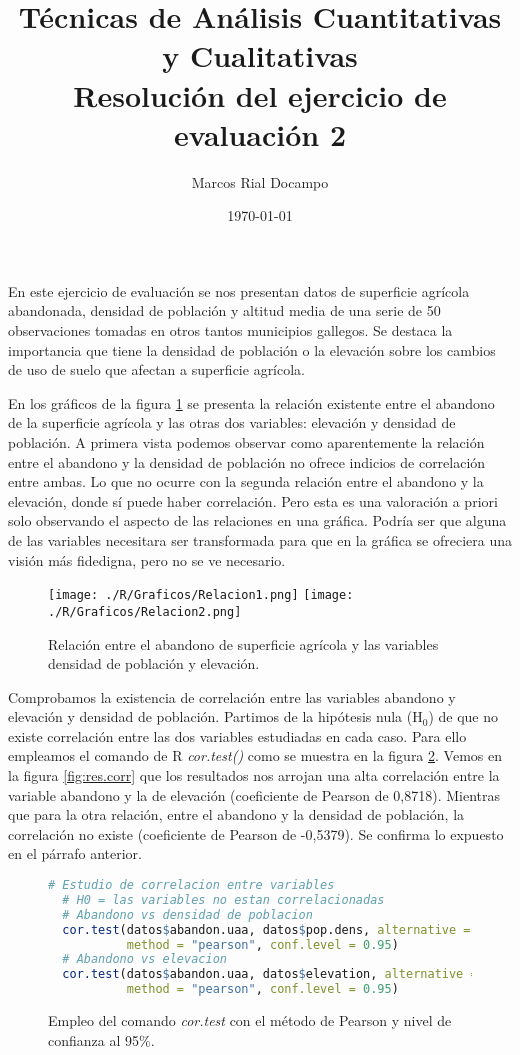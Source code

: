 \documentclass[11pt,a4paper]{article}
\author{Marcos Rial Docampo}
\title{Técnicas de Análisis Cuantitativas y Cualitativas\\Resolución del ejercicio de evaluación 2}
\date{\small{\today}}
\begin{document}
\maketitle

En este ejercicio de evaluación se nos presentan datos de superficie agrícola abandonada, densidad de población y altitud media de una serie de 50 observaciones tomadas en otros tantos municipios gallegos. Se destaca la importancia que tiene la densidad de población o la elevación sobre los cambios de uso de suelo que afectan a superficie agrícola.

En los gráficos de la figura \ref{fig:graficas} se presenta la relación existente entre el abandono de la superficie agrícola y las otras dos variables: elevación y densidad de población. A primera vista podemos observar como aparentemente la relación entre el abandono y la densidad de población no ofrece indicios de correlación entre ambas. Lo que no ocurre con la segunda relación entre el abandono y la elevación, donde sí puede haber correlación. Pero esta es una valoración a priori solo observando el aspecto de las relaciones en una gráfica. Podría ser que alguna de las variables necesitara ser transformada para que en la gráfica se ofreciera una visión más fidedigna, pero no se ve necesario.

\begin{figure}
	\centering
	\texttt{[image: ./R/Graficos/Relacion1.png]}
	\texttt{[image: ./R/Graficos/Relacion2.png]}
	\caption{Relación entre el abandono de superficie agrícola y las variables densidad de población y elevación.}
	\label{fig:graficas}
\end{figure}

Comprobamos la existencia de correlación entre las variables abandono y elevación y densidad de población. Partimos de la hipótesis nula (H$_0$) de que no existe correlación entre las dos variables estudiadas en cada caso. Para ello empleamos el comando de R \textit{cor.test()} como se muestra en la figura \ref{fig:cor.test}. Vemos en la figura \ref{fig:res.corr} que los resultados nos arrojan una alta correlación entre la variable abandono y la de elevación (coeficiente de Pearson de 0,8718). Mientras que para la otra relación, entre el abandono y la densidad de población, la correlación no existe (coeficiente de Pearson de -0,5379). Se confirma lo expuesto en el párrafo anterior.

\begin{figure}
\centering
\begin{lstlisting}[language = R]
  # Estudio de correlacion entre variables
  # H0 = las variables no estan correlacionadas
  # Abandono vs densidad de poblacion
  cor.test(datos$abandon.uaa, datos$pop.dens, alternative = "greater",
           method = "pearson", conf.level = 0.95)
  # Abandono vs elevacion
  cor.test(datos$abandon.uaa, datos$elevation, alternative = "greater",
           method = "pearson", conf.level = 0.95)
\end{lstlisting}
\caption{Empleo del comando \textit{cor.test} con el método de Pearson y nivel de confianza al 95\%.}
\label{fig:cor.test}
\end{figure}
\end{document}
